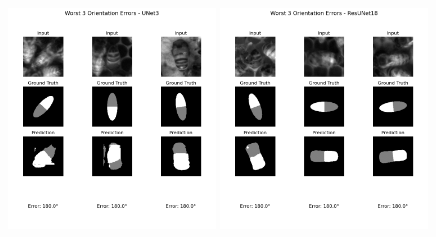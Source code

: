 \begin{figure}[htbp]
    \centering
    \includegraphics[width=0.49\textwidth]{figures/results/5 - fails/UNet3 Worst Orientation Errors.png}
    \hfill
    \includegraphics[width=0.49\textwidth]{figures/results/5 - fails/ResUNet18 Worst Orientation Errors.png}


\end{figure}
